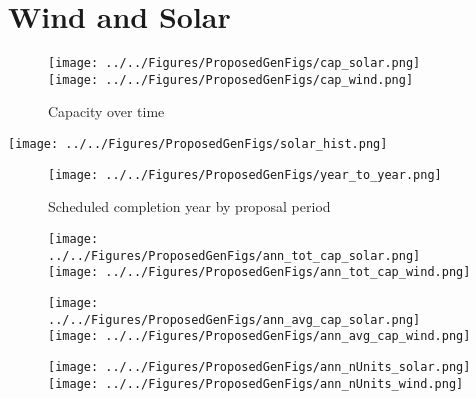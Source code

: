 \documentclass[12pt, oneside]{article}   	%
\begin{document}
\vfill
\clearpage

\section{Wind and Solar} 
\begin{figure}[h!]
\centering
\caption{Capacity over time}
\texttt{[image: ../../Figures/ProposedGenFigs/cap\_solar.png]}
\texttt{[image: ../../Figures/ProposedGenFigs/cap\_wind.png]}
\end{figure}

\begin{center}
\texttt{[image: ../../Figures/ProposedGenFigs/solar\_hist.png]}
\end{center}

\begin{figure}[!hb]
\centering
\caption{Scheduled completion year by proposal period}
\texttt{[image: ../../Figures/ProposedGenFigs/year\_to\_year.png]}
\end{figure}









\begin{figure}[ht]
\texttt{[image: ../../Figures/ProposedGenFigs/ann\_tot\_cap\_solar.png]}
\texttt{[image: ../../Figures/ProposedGenFigs/ann\_tot\_cap\_wind.png]}
\end{figure}

\begin{figure}[ht]
\texttt{[image: ../../Figures/ProposedGenFigs/ann\_avg\_cap\_solar.png]}
\texttt{[image: ../../Figures/ProposedGenFigs/ann\_avg\_cap\_wind.png]}
\end{figure}

\begin{figure}[ht]
\texttt{[image: ../../Figures/ProposedGenFigs/ann\_nUnits\_solar.png]}
\texttt{[image: ../../Figures/ProposedGenFigs/ann\_nUnits\_wind.png]}
\end{figure}
\end{document}
